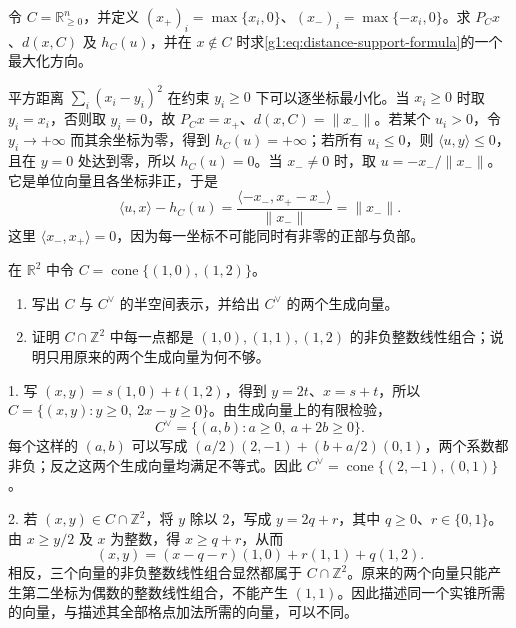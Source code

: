 \begin{exercise}\label{g1:ex:orthant-distance}
	令 \(C=\mathbb R_{\ge0}^n\)，并定义 \((x_+)_i=\max\{x_i,0\}\)、\((x_-)_i=\max\{-x_i,0\}\)。求 \(P_Cx\)、\(d(x,C)\) 及 \(h_C(u)\)，并在 \(x\notin C\) 时求\eqref{g1:eq:distance-support-formula}的一个最大化方向。
\end{exercise}
\begin{solution}
	平方距离 \(\sum_i(x_i-y_i)^2\) 在约束 \(y_i\ge0\) 下可以逐坐标最小化。当 \(x_i\ge0\) 时取 \(y_i=x_i\)，否则取 \(y_i=0\)，故 \(P_Cx=x_+\)、\(d(x,C)=\lVert x_-\rVert\)。若某个 \(u_i>0\)，令 \(y_i\to+\infty\) 而其余坐标为零，得到 \(h_C(u)=+\infty\)；若所有 \(u_i\le0\)，则 \(\langle u,y\rangle\le0\)，且在 \(y=0\) 处达到零，所以 \(h_C(u)=0\)。当 \(x_-\ne0\) 时，取 \(u=-x_-/\lVert x_-\rVert\)。它是单位向量且各坐标非正，于是
	\[
		\langle u,x\rangle-h_C(u)=\frac{\langle-x_-,x_+-x_-\rangle}{\lVert x_-\rVert}
		=\lVert x_-\rVert.
	\]
	这里 \(\langle x_-,x_+\rangle=0\)，因为每一坐标不可能同时有非零的正部与负部。
\end{solution}

\begin{exercise}\label{g1:ex:cone-lattice-generators}
	在 \(\mathbb R^2\) 中令 \(C=\operatorname{cone}\{(1,0),(1,2)\}\)。
	\begin{enumerate}
		\item 写出 \(C\) 与 \(C^\vee\) 的半空间表示，并给出 \(C^\vee\) 的两个生成向量。
		\item 证明 \(C\cap\mathbb Z^2\) 中每一点都是 \((1,0),(1,1),(1,2)\) 的非负整数线性组合；说明只用原来的两个生成向量为何不够。
	\end{enumerate}
\end{exercise}
\begin{solution}
	1. 写 \((x,y)=s(1,0)+t(1,2)\)，得到 \(y=2t\)、\(x=s+t\)，所以 \(C=\{(x,y):y\ge0,\ 2x-y\ge0\}\)。由生成向量上的有限检验，
	\[
		C^\vee=\{(a,b):a\ge0,\ a+2b\ge0\}.
	\]
	每个这样的 \((a,b)\) 可以写成 \((a/2)(2,-1)+(b+a/2)(0,1)\)，两个系数都非负；反之这两个生成向量均满足不等式。因此 \(C^\vee=\operatorname{cone}\{(2,-1),(0,1)\}\)。

	2. 若 \((x,y)\in C\cap\mathbb Z^2\)，将 \(y\) 除以 \(2\)，写成 \(y=2q+r\)，其中 \(q\ge0\)、\(r\in\{0,1\}\)。由 \(x\ge y/2\) 及 \(x\) 为整数，得 \(x\ge q+r\)，从而
	\[
		(x,y)=(x-q-r)(1,0)+r(1,1)+q(1,2).
	\]
	相反，三个向量的非负整数线性组合显然都属于 \(C\cap\mathbb Z^2\)。原来的两个向量只能产生第二坐标为偶数的整数线性组合，不能产生 \((1,1)\)。因此描述同一个实锥所需的向量，与描述其全部格点加法所需的向量，可以不同。
\end{solution}


